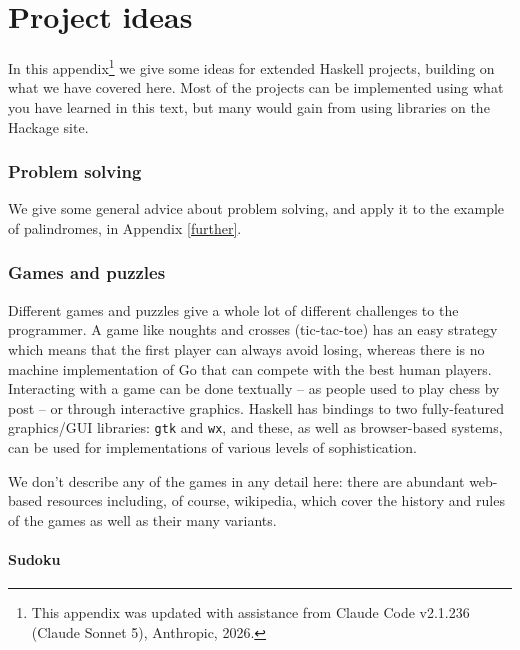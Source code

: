 

\chapter{Project ideas}
\label{projects}
\normalfont\normalsize

In this appendix\footnote{This appendix was updated with assistance from Claude Code v2.1.236 (Claude Sonnet 5), Anthropic, 2026.} we give some ideas for extended Haskell projects, building on what we have covered here. Most of the projects can be implemented using what you have learned in this text, but many would gain from using libraries on the Hackage site.

\subsection*{Problem solving}

We give some general advice about problem solving, and apply it to the example of palindromes, in Appendix \ref{further}.

\subsection*{Games and puzzles}

Different games and puzzles give a whole lot of different challenges to the programmer. A game like noughts and crosses (tic-tac-toe) has an easy strategy which means that the first player can always avoid losing, whereas there is no machine implementation of Go that can compete with the best human players. Interacting with a game can be done textually -- as people used to play chess by post -- or through interactive graphics. Haskell has bindings to two fully-featured graphics/GUI libraries: \texttt{gtk} and \texttt{wx}, and these, as well as browser-based systems, can be used for implementations of various levels of sophistication.

We don't describe any of the games in any detail here: there are abundant web-based resources including, of course, wikipedia, which cover the history and rules of the games as well as their many variants.

\subsubsection*{Sudoku}


